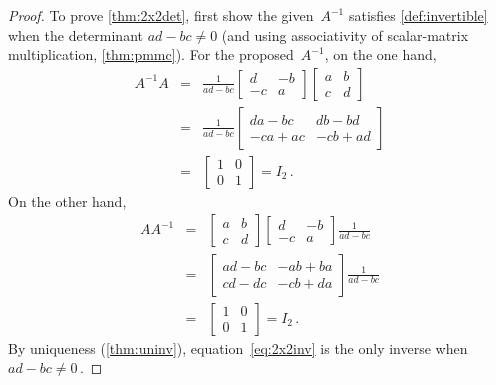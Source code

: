 \begin{proof} 
To prove \autoref{thm:2x2det}, first show the given~\(A^{-1}\) satisfies \autoref{def:invertible} when the determinant \(ad-bc\neq 0\) (and using associativity of scalar-matrix multiplication, \autoref{thm:pmmc}).
For the proposed~\(A^{-1}\), on the one hand,
\begin{eqnarray*}
A^{-1}A&=&\frac1{ad-bc}\begin{bmatrix} d&-b\\-c&a \end{bmatrix}
\begin{bmatrix} a&b\\c&d \end{bmatrix}
\\&=&\frac1{ad-bc}\begin{bmatrix} da-bc&db-bd\\-ca+ac&-cb+ad \end{bmatrix}
\\&=&\begin{bmatrix} 1&0\\0&1 \end{bmatrix}=I_2\,.
\end{eqnarray*}
On the other hand,
\begin{eqnarray*}
AA^{-1}&=&
\begin{bmatrix} a&b\\c&d \end{bmatrix}\begin{bmatrix} d&-b\\-c&a \end{bmatrix}\frac1{ad-bc}
\\&=&\begin{bmatrix} ad-bc&-ab+ba\\cd-dc&-cb+da \end{bmatrix}\frac1{ad-bc}
\\&=&\begin{bmatrix} 1&0\\0&1 \end{bmatrix}=I_2\,.
\end{eqnarray*}
By uniqueness (\autoref{thm:uninv}), equation~\eqref{eq:2x2inv} is the only inverse when \(ad-bc\neq 0\)\,.


\end{proof}
